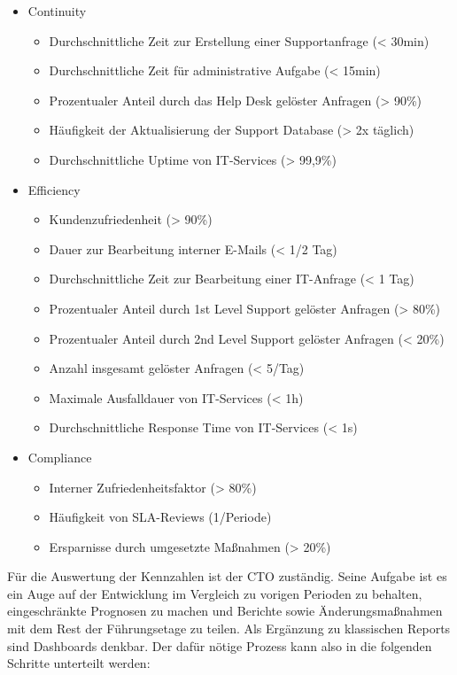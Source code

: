 \begin{itemize}
\item Continuity
  \begin{itemize}
  \item Durchschnittliche Zeit zur Erstellung einer Supportanfrage (< 30min)
  \item Durchschnittliche Zeit für administrative Aufgabe (< 15min)
  \item Prozentualer Anteil durch das Help Desk gelöster Anfragen (> 90\%)
  \item Häufigkeit der Aktualisierung der Support Database (> 2x täglich)
  \item Durchschnittliche Uptime von IT-Services (> 99,9\%)
  \end{itemize}
\item Efficiency
  \begin{itemize}
  \item Kundenzufriedenheit (> 90\%)
  \item Dauer zur Bearbeitung interner E-Mails (< 1/2 Tag)
  \item Durchschnittliche Zeit zur Bearbeitung einer IT-Anfrage (< 1 Tag)
  \item Prozentualer Anteil durch 1st Level Support gelöster Anfragen (> 80\%)
  \item Prozentualer Anteil durch 2nd Level Support gelöster Anfragen (< 20\%)
  \item Anzahl insgesamt gelöster Anfragen (< 5/Tag)
  \item Maximale Ausfalldauer von IT-Services (< 1h)
  \item Durchschnittliche Response Time von IT-Services (< 1s)
  \end{itemize}
\item Compliance
  \begin{itemize}
  \item Interner Zufriedenheitsfaktor (> 80\%)
  \item Häufigkeit von SLA-Reviews (1/Periode)
  \item Ersparnisse durch umgesetzte Maßnahmen (> 20\%)
  \end{itemize}
\end{itemize}

Für die Auswertung der Kennzahlen ist der CTO zuständig.  Seine
Aufgabe ist es ein Auge auf der Entwicklung im Vergleich zu vorigen
Perioden zu behalten, eingeschränkte Prognosen zu machen und Berichte
sowie Änderungsmaßnahmen mit dem Rest der Führungsetage zu teilen.
Als Ergänzung zu klassischen Reports sind Dashboards denkbar.  Der
dafür nötige Prozess kann also in die folgenden Schritte unterteilt
werden:

